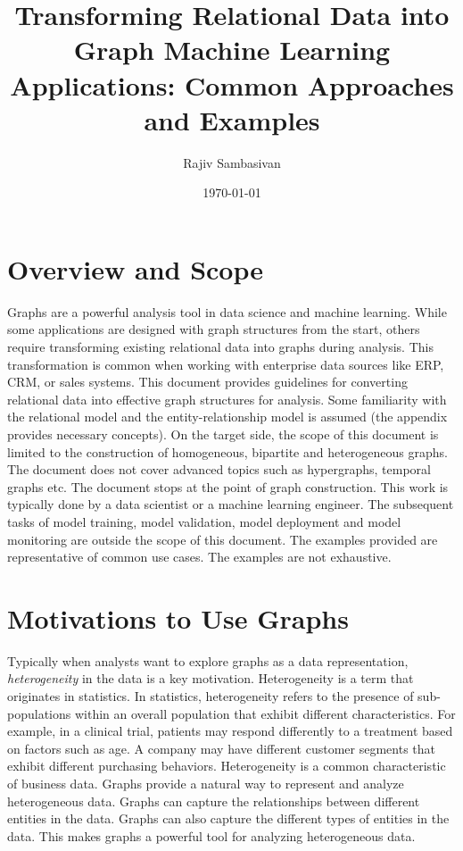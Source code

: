 \documentclass{article}
\title{Transforming Relational Data into Graph Machine Learning Applications: Common Approaches and Examples}
\author{Rajiv Sambasivan}
\date{\today}
\begin{document}
\maketitle

\section{Overview and Scope}
Graphs are a powerful analysis tool in data science and machine learning. While some applications are designed with graph structures from the start, others require transforming existing relational data into graphs during analysis. This transformation is common when working with enterprise data sources like ERP, CRM, or sales systems. This document provides guidelines for converting relational data into effective graph structures for analysis.
Some familiarity with the relational model and the entity-relationship model is assumed (the appendix provides necessary concepts). On the target side, the scope of this document is limited to the construction of homogeneous, bipartite and heterogeneous graphs. The document does not cover advanced topics such as hypergraphs, temporal graphs etc. The document stops at the point of graph construction. This work is typically done by a data scientist or a machine learning engineer. The subsequent tasks of model training, model validation, model deployment and model monitoring are outside the scope of this document. The examples provided are representative of common use cases. The examples are not exhaustive. 

\section{Motivations to Use Graphs}
Typically when analysts want to explore graphs as a data representation, \emph{heterogeneity} in the data is a key motivation. Heterogeneity is a term that originates in statistics. In statistics, heterogeneity refers to the presence of sub-populations within an overall population that exhibit different characteristics. For example, in a clinical trial, patients may respond differently to a treatment based on factors such as age. A company may have different customer segments that exhibit different purchasing behaviors. Heterogeneity is a common characteristic of business data. Graphs provide a natural way to represent and analyze heterogeneous data. Graphs can capture the relationships between different entities in the data. Graphs can also capture the different types of entities in the data. This makes graphs a powerful tool for analyzing heterogeneous data.
\end{document}
